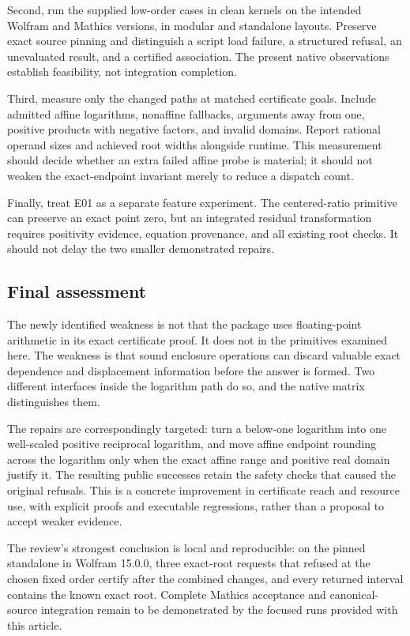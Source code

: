 \documentclass[11pt,letterpaper]{article}
\theoremstyle{remark}\newtheorem{remark}[proposition]{Remark}
\begin{document}
Second, run the supplied low-order cases in clean kernels on the intended
Wolfram and Mathics versions, in modular and standalone layouts. Preserve
exact source pinning and distinguish a script load failure, a structured
refusal, an unevaluated result, and a certified association. The present
native observations establish feasibility, not integration completion.

Third, measure only the changed paths at matched certificate goals. Include
admitted affine logarithms, nonaffine fallbacks, arguments away from one,
positive products with negative factors, and invalid domains. Report rational
operand sizes and achieved root widths alongside runtime. This measurement
should decide whether an extra failed affine probe is material; it should
not weaken the exact-endpoint invariant merely to reduce a dispatch count.

Finally, treat E01 as a separate feature experiment. The centered-ratio
primitive can preserve an exact point zero, but an integrated residual
transformation requires positivity evidence, equation provenance, and all
existing root checks. It should not delay the two smaller demonstrated
repairs.

\subsection{Final assessment}
The newly identified weakness is not that the package uses floating-point
arithmetic in its exact certificate proof. It does not in the primitives
examined here. The weakness is that sound enclosure operations can discard
valuable exact dependence and displacement information before the answer is
formed. Two different interfaces inside the logarithm path do so, and the
native matrix distinguishes them.

The repairs are correspondingly targeted: turn a below-one logarithm into
one well-scaled positive reciprocal logarithm, and move affine endpoint
rounding across the logarithm only when the exact affine range and positive
real domain justify it. The resulting public successes retain the safety
checks that caused the original refusals. This is a concrete improvement in
certificate reach and resource use, with explicit proofs and executable
regressions, rather than a proposal to accept weaker evidence.

The review's strongest conclusion is local and reproducible: on the pinned
standalone in Wolfram 15.0.0, three exact-root requests that refused at the
chosen fixed order certify after the combined changes, and every returned
interval contains the known exact root. Complete Mathics acceptance and
canonical-source integration remain to be demonstrated by the focused runs
provided with this article.
\end{document}
